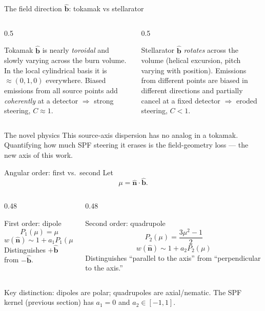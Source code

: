 \documentclass[aspectratio=169]{beamer}
\newcommand{\bn}{\hat{\bm n}}
\newcommand{\bb}{\hat{\bm b}}
\newcommand{\Ptwo}{P_2}
\newcommand{\Pone}{P_1}
\begin{document}
\begin{frame}[t]{The field direction $\bb$: tokamak vs stellarator}
\begin{columns}[T]
\begin{column}{0.5\textwidth}
\begin{block}{Tokamak}
$\bb$ is nearly \emph{toroidal} and slowly varying across the burn volume. In the local cylindrical basis it is $\approx(0,1,0)$ everywhere. Biased emissions from all source points add \emph{coherently} at a detector $\Rightarrow$ strong steering, $C\approx 1$.
\end{block}
\end{column}
\begin{column}{0.5\textwidth}
\begin{block}{Stellarator}
$\bb$ \emph{rotates} across the volume (helical excursion, pitch varying with position). Emissions from different points are biased in different directions and partially cancel at a fixed detector $\Rightarrow$ eroded steering, $C<1$.
\end{block}
\end{column}
\end{columns}
\vspace{0.6em}
\begin{block}{The novel physics}
This source-axis dispersion has no analog in a tokamak. Quantifying how much SPF steering it erases is the field-geometry loss --- the new axis of this work.
\end{block}
\end{frame}

\begin{frame}[t]{Angular order: first vs.\ second}
Let
\[
\mu = \bn\cdot\bb .
\]
\begin{columns}[T]
\begin{column}{0.48\textwidth}
\begin{block}{First order: dipole}
\[
\Pone(\mu)=\mu
\]
\[
w(\bn)\sim 1+a_1\Pone(\mu)
\]
Distinguishes $+\bb$ from $-\bb$.
\end{block}
\end{column}
\begin{column}{0.48\textwidth}
\begin{block}{Second order: quadrupole}
\[
\Ptwo(\mu)=\frac{3\mu^2-1}{2}
\]
\[
w(\bn)\sim 1+a_2\Ptwo(\mu)
\]
Distinguishes ``parallel to the axis'' from ``perpendicular to the axis.''
\end{block}
\end{column}
\end{columns}
\vspace{0.5em}
Key distinction: dipoles are polar; quadrupoles are axial/nematic. The SPF kernel (previous section) has $a_1=0$ and $a_2\in[-1,1]$.
\end{frame}
\end{document}
